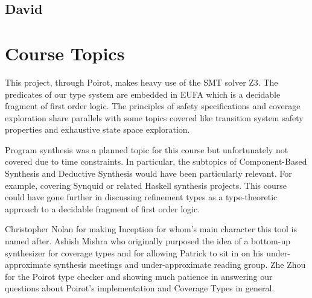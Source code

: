 \documentclass[review, sigplan]{acmart}
\begin{document}
\subsection{David}

\section{Course Topics}
This project, through Poirot, makes heavy use of the SMT solver Z3. The
predicates of our type system are embedded in EUFA which is a decidable fragment
of first order logic. The principles of safety specifications and coverage
exploration share parallels with some topics covered like transition system
safety properties and exhaustive state space exploration.

Program synthesis was a planned topic for this course but unfortunately not
covered due to time constraints. In particular, the subtopics of Component-Based
Synthesis and Deductive Synthesis would have been particularly relevant. For
example, covering Synquid or related Haskell synthesis projects. This course
could have gone further in discussing refinement types as a type-theoretic
approach to a decidable fragment of first order logic.

\begin{acks}
  Christopher Nolan for making Inception for whom's main character this tool is
  named after.
  Ashish Mishra who originally purposed the idea of a bottom-up synthesizer
  for coverage types and for allowing Patrick to sit in on his
  under-approximate synthesis meetings and under-approximate reading group.
  Zhe Zhou for the Poirot type checker and showing much patience in answering
  our questions about Poirot's implementation and Coverage Types in general.
\end{acks}



\end{document}
